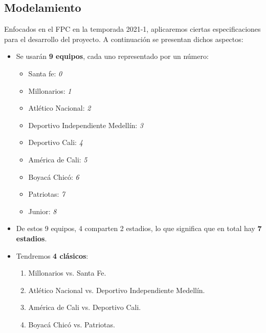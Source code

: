 \documentclass[11pt]{article}
\begin{document}
\begin{multicols}{2}
        \section{Modelamiento}
            Enfocados en el FPC en la temporada 2021-1, aplicaremos ciertas especificaciones para el desarrollo del proyecto. A continuación se presentan dichos aspectos:
            \begin{itemize}
                \item  Se usarán \textbf{9 equipos}, cada uno representado por un número:
                \begin{itemize}[label=$\diamond$]
                    \item Santa fe: \textit{0}
                    \item Millonarios: \textit{1}
                    \item Atlético Nacional: \textit{2}
                    \item Deportivo Independiente Medellín: \textit{3}
                    \item Deportivo Cali: \textit{4}
                    \item América de Cali: \textit{5}
                    \item Boyacá Chicó: \textit{6}
                    \item Patriotas: \textit{7}
                    \item Junior: \textit{8}
                \end{itemize}  
                \item  De estos 9 equipos, 4 comparten 2 estadios, lo que significa que en total hay \textbf{7 estadios}.
                \item  Tendremos \textbf{4 clásicos}:
                \begin{enumerate}
                    \item  Millonarios vs. Santa Fe.
                    \item  Atlético Nacional vs. Deportivo Independiente Medellín.
                    \item  América de Cali vs. Deportivo Cali.
                    \item  Boyacá Chicó vs. Patriotas.
                \end{enumerate}
            \end{itemize}


\end{multicols}
\end{document}

